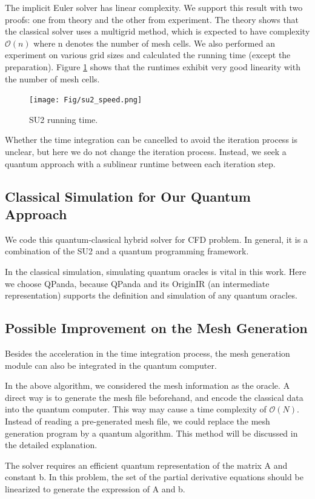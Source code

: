 \documentclass[%
 reprint,
 amsmath,amssymb,
pra,
]{revtex4-1}
\begin{document}
The implicit Euler solver has linear complexity. We support this result with two proofs: one from theory and the other from experiment. The theory shows that the classical solver uses a multigrid method, which is expected to have complexity $\mathcal{O}(n)$ where n denotes the number of mesh cells. We also performed an experiment on various grid sizes and calculated the running time (except the preparation). Figure \ref{su2Speed} shows that the runtimes exhibit very good linearity with the number of mesh cells.

\begin{figure} 
\centering
\texttt{[image: Fig/su2\_speed.png]}
\caption{SU2 running time.} \label{su2Speed}
\end{figure}

Whether the time integration can be cancelled to avoid the iteration process is unclear, but here we do not change the iteration process. Instead, we seek a quantum approach with a sublinear runtime between each iteration step.

\subsection{Classical Simulation for Our Quantum Approach}
We code this quantum-classical hybrid solver for CFD problem. In general, it is a combination of the SU2 and a quantum programming framework.

In the classical simulation, simulating quantum oracles is vital in this work. Here we choose QPanda, because QPanda and its OriginIR (an intermediate representation) supports the definition and simulation of any quantum oracles. 

\subsection{Possible Improvement on the Mesh Generation}
Besides the acceleration in the time integration process, the mesh generation module can also be integrated in the quantum computer.

In the above algorithm, we considered the mesh information as the oracle. A direct way is to generate the mesh file beforehand, and encode the classical data into the quantum computer. This way may cause a time complexity of $\mathcal{O}(N)$. Instead of reading a pre-generated mesh file, we could replace the mesh generation program by a quantum algorithm. This method will be discussed in the detailed explanation.

The solver requires an efficient quantum representation of the matrix A and constant b. In this problem, the set of the partial derivative equations should be linearized to generate the expression of A and b.
\end{document}
